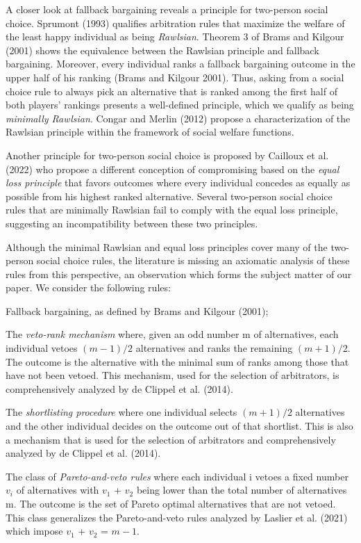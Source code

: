 \documentclass[version=3.21, pagesize, twoside=off, bibliography=totoc, DIV=calc, fontsize=12pt, a4paper]{scrartcl}
\begin{document}
A closer look at fallback bargaining reveals a principle for two-person social choice. Sprumont (1993) qualifies arbitration rules that maximize the welfare of the least happy individual as being \textit{Rawlsian}. Theorem 3 of Brams and Kilgour (2001) shows the equivalence between the Rawlsian principle and fallback bargaining. Moreover, every individual ranks a fallback bargaining outcome in the upper half of his ranking (Brams and Kilgour 2001). Thus, asking from a social choice rule to always pick an alternative that is ranked among the first half of both players’ rankings presents a well-defined principle, which we qualify as being \textit{minimally Rawlsian}. Congar and Merlin (2012) propose a characterization of the Rawlsian principle within the framework of social welfare functions. 

Another principle for two-person social choice is proposed by Cailloux et al. (2022) who propose a different conception of compromising based on the \textit{equal loss principle} that favors outcomes where every individual concedes as equally as possible from his highest ranked alternative. Several two-person social choice rules that are minimally Rawlsian fail to comply with the equal loss principle, suggesting an incompatibility between these two principles.
 
Although the minimal Rawlsian and equal loss principles cover many of the two-person social choice rules, the literature is missing an axiomatic analysis of these rules from this perspective, an observation which forms the subject matter of our paper. We consider the following rules:

Fallback bargaining, as defined by Brams and Kilgour (2001);

The \textit{veto-rank mechanism} where, given an odd number m of alternatives, each individual vetoes $(m−1) / 2$ alternatives and ranks the remaining $(m+1) / 2$. The outcome is the alternative with the minimal sum of ranks among those that have not been vetoed. This mechanism, used for the selection of arbitrators, is comprehensively analyzed by de Clippel et al. (2014).


The \textit{shortlisting procedure} where one individual selects $(m+1) / 2$ alternatives and the other individual decides on the outcome out of that shortlist. This is also a mechanism that is used for the selection of arbitrators and comprehensively analyzed by de Clippel et al. (2014).


The class of \textit{Pareto-and-veto rules} where each individual i vetoes a fixed number $v_i$ of alternatives with $v_1$ + $v_2$ being lower than the total number of alternatives m. The outcome is the set of Pareto optimal alternatives that are not vetoed. This class generalizes the Pareto-and-veto rules analyzed by Laslier et al. (2021) which impose $v_1$ + $v_2$ = $m-1$.
  
\end{document}
